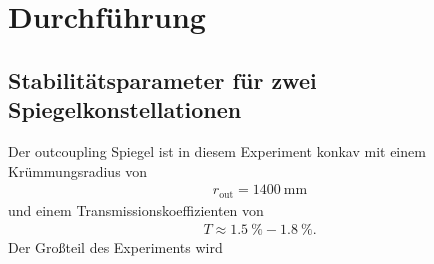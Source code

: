  \section{Durchführung}
\label{sec:Durchführung}

\subsection{Stabilitätsparameter für zwei Spiegelkonstellationen}

Der outcoupling Spiegel ist in diesem Experiment konkav mit einem
Krümmungsradius von
\begin{align}
  r_\text{out} = \SI{1400}{\milli\meter}
\end{align}
und einem Transmissionskoeffizienten von
\begin{align}
  T \approx \SI{1.5}{\percent} - \SI{1.8}{\percent}.
\end{align}
Der Großteil des Experiments wird 
